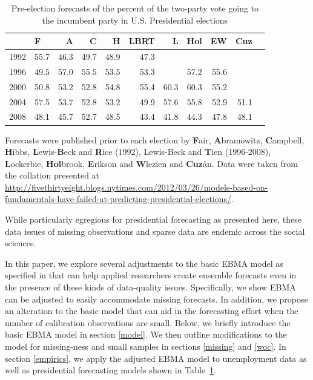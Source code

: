 \documentclass[12pt,fullpage,endnotes]{article}
\begin{document}
\begin{table}[ht]
\caption{Pre-election forecasts of the percent of the two-party vote going to the incumbent party in U.S. Presidential elections}
\label{tab:one}
\footnotesize
\begin{center}
\begin{tabular}{rlrrrrrrrrr}
  \toprule
  & F & A & C & H & LBRT & L & Hol & EW & Cuz \\ 
  \midrule
  1992 & 55.7 & 46.3 & 49.7 & 48.9 & 47.3 &  &  &  &  \\ 
  1996 & 49.5 & 57.0 & 55.5 & 53.5 & 53.3 &  & 57.2 & 55.6 &  \\ 
  2000 & 50.8 & 53.2 & 52.8 & 54.8 & 55.4 & 60.3 & 60.3 & 55.2 &  \\ 
  2004 & 57.5 & 53.7 & 52.8 & 53.2 & 49.9 & 57.6 & 55.8 & 52.9 & 51.1 \\ 
  2008 & 48.1 & 45.7 & 52.7 & 48.5 & 43.4 & 41.8 & 44.3 & 47.8 & 48.1 \\ 
  \bottomrule

\end{tabular}
\end{center}
Forecasts were published prior to each election by \textbf{F}air, \textbf{A}bramowitz, \textbf{C}ampbell, \textbf{H}ibbs, \textbf{L}ewis-\textbf{B}eck and \textbf{R}ice (1992), Lewis-Beck and \textbf{T}ien  (1996-2008),   \textbf{L}ockerbie, \textbf{Hol}brook, \textbf{E}rikson and \textbf{W}lezien and \textbf{Cuz}\`an.  Data were taken from the collation presented at \url{http://fivethirtyeight.blogs.nytimes.com/2012/03/26/models-based-on-fundamentals-have-failed-at-predicting-presidential-elections/}.
\end{table}

While particularly egregious for presidential forecasting as presented here, these data
issues of missing observations and sparse data are endemic across the social sciences.

In this paper, we explore several adjustments to the basic EBMA model
as specified in \citet{mhw:2012} that can help applied
researchers create ensemble forecasts even in the presence of these
kinds of data-quality issues.  Specifically, we show EBMA can be
adjusted to easily accommodate missing forecasts.  In addition, we
propose an alteration to the basic model that can aid in the forecasting effort when the number of calibration observations are small.  Below, we briefly introduce
the basic EBMA model in section \ref{model}.  We then outline modifications
to the model for missing-ness and small samples in sections
\ref{missing} and \ref{woc}. In section \ref{empirics}, we apply the
adjusted EBMA model to unemployment data as well as presidential
forecasting models shown in Table~\ref{tab:one}.
\end{document}
